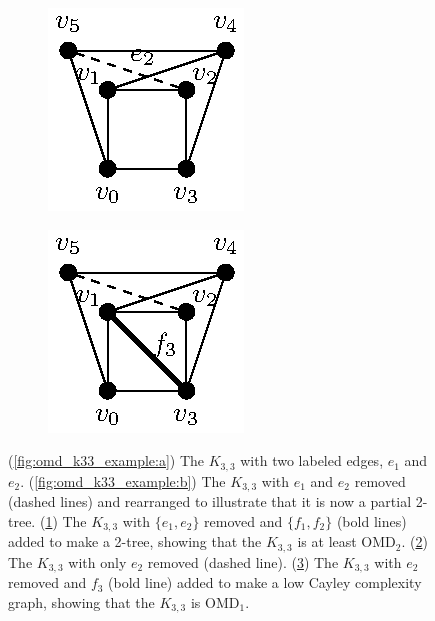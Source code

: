 \begin{figure}
\begin{subfigure}{.15\linewidth}
        \caption{}\label{fig:omd_k33_example:c}
    \end{subfigure}\hfill
    \begin{subfigure}{.15\linewidth}\centering
        \includegraphics[height=\myMinHeight]{../../img/epsfromtikz/omd_k33_example-1}
        \caption{}\label{fig:omd_k33_example:d}
    \end{subfigure}
    \begin{subfigure}{.15\linewidth}\centering
        \includegraphics[height=\myMinHeight]{../../img/epsfromtikz/omd_k33_example-2}
        \caption{}\label{fig:omd_k33_example:e}
    \end{subfigure}

    \caption{
    (\ref{fig:omd_k33_example:a}) The $K_{3,3}$ with two labeled edges, $e_1$ and $e_2$. (\ref{fig:omd_k33_example:b}) The $K_{3,3}$ with $e_1$ and $e_2$ removed (dashed lines) and rearranged to illustrate that it is now a partial 2-tree. (\ref{fig:omd_k33_example:c}) The $K_{3,3}$ with $\{e_1,e_2\}$ removed and $\{f_1,f_2\}$ (bold lines) added to make a 2-tree, showing that the $K_{3,3}$ is at least OMD$_2$. (\ref{fig:omd_k33_example:d}) The $K_{3,3}$ with only $e_2$ removed (dashed line). (\ref{fig:omd_k33_example:e}) The $K_{3,3}$ with $e_2$ removed and $f_3$ (bold line) added to make a low Cayley complexity graph, showing that the $K_{3,3}$ is OMD$_1$.
    }
    \label{fig:omd_k33_example}
\end{figure}

